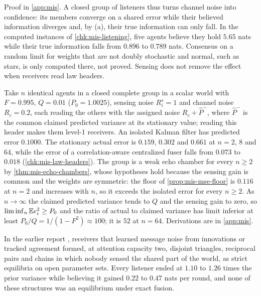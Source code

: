 Proof in \cref{app:mis}. A closed group of listeners thus turns channel noise into confidence: its members converge on a shared error while their believed information diverges and, by (a), their true information can only fall. In the computed instances of \cref{chk:mis-listening}, five agents believe they hold $5.65$ nats while their true information falls from $0.896$ to $0.789$ nats. Consensus on a random limit for weights that are not doubly stochastic and normal, such as stars, is only computed there, not proved. Sensing does not remove the effect when receivers read law headers.

\begin{example}\label{ex:mis-law-headers}
Take $n$ identical agents in a closed complete group in a scalar world with $F=0.995$, $Q=0.01$ ($P_0=1.0025$), sensing noise $R^s_i=1$ and channel noise $R_c=0.2$, each reading the others with the assigned noise $R_c+\hat P^-$, where $\hat P^-$ is the common claimed predicted variance at its stationary value; reading this header makes them level-1 receivers. An isolated Kalman filter has predicted error $0.1000$. The stationary actual error is $0.159$, $0.302$ and $0.661$ at $n=2$, $8$ and $64$, while the error of a correlation-aware centralized fuser falls from $0.073$ to $0.018$ (\cref{chk:mis-law-headers}). The group is a weak echo chamber for every $n\ge2$ by \cref{thm:mis-echo-chambers}, whose hypotheses hold because the sensing gain is common and the weights are symmetric: the floor of \cref{prop:mis-mse-floor} is $0.116$ at $n=2$ and increases with $n$, so it exceeds the isolated error for every $n\ge2$. As $n\to\infty$ the claimed predicted variance tends to $Q$ and the sensing gain to zero, so $\liminf_n\mathbb{E} e_i^2\ge P_0$ and the ratio of actual to claimed variance has limit inferior at least $P_0/Q=1/(1-F^2)\approx100$; it is $52$ at $n=64$. Derivations are in \cref{app:mis}.
\end{example}

\begin{remark}\label{rem:mis-report-echo}
In the earlier report \citep{dennis2026communicating}, receivers that learned message noise from innovations or tracked agreement formed, at attention capacity two, disjoint triangles, reciprocal pairs and chains in which nobody sensed the shared part of the world, as strict equilibria on open parameter sets. Every listener ended at $1.10$ to $1.26$ times the prior variance while believing it gained $0.22$ to $0.47$ nats per round, and none of these structures was an equilibrium under exact fusion.
\end{remark}

